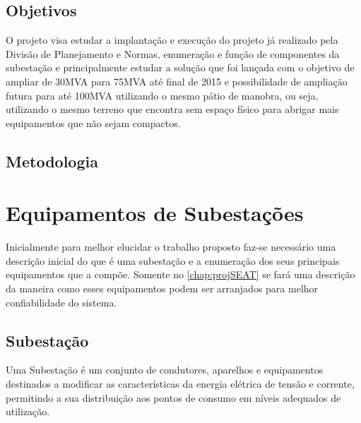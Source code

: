 \documentclass[a5paper,english,spanish,brazil]{ufsc-thesis}
\begin{document}
	\section{Objetivos}
		O projeto visa estudar a implantação e execução do projeto já realizado pela Divisão de Planejamento e Normas, enumeração e função de componentes da subestação e principalmente estudar a solução que foi lançada com o objetivo de ampliar de 30MVA para 75MVA até final de 2015 e possibilidade de ampliação futura para até 100MVA utilizando o mesmo pátio de manobra, ou seja, utilizando o mesmo terreno que encontra sem espaço físico para abrigar mais equipamentos que não sejam compactos.

	\section{Metodologia}
	\lipsum[1]



\chapter{Equipamentos de Subestações}
	\label{chap:equipSE}
	Inicialmente para melhor elucidar o trabalho proposto faz-se necessário uma descrição inicial do que é uma subestação e a enumeração dos seus principais equipamentos que a compõe. Somente no \autoref{chap:projSEAT} se fará uma descrição da maneira como esses equipamentos podem ser arranjados para melhor confiabilidade do sistema.
	\section*{Subestação}
	Uma Subestação é um conjunto de condutores, aparelhos e equipamentos destinados a modificar as características da energia elétrica de tensão e corrente, permitindo a sua distribuição aos pontos de consumo em níveis adequados de utilização.\cite{instElet}
\end{document}

